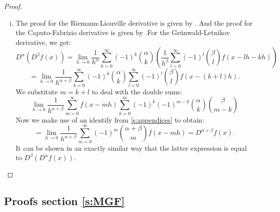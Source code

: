 \begin{proof}
\begin{enumerate}[(i)]
        \item The proof for the Riemann-Liouville derivative is given by \cite{koning15}. And the proof for the Caputo-Fabrizio derivative is given by \cite{losada15}.For the Grünwald-Letnikov derivative, we get:
        \[ D^\alpha(D^\beta f(x)) = \lim_{h \to 0} \frac{1}{h^\alpha} \sum_{k=0}^\infty (-1)^k \binom{\alpha}{k} \left( \frac{1}{h^\beta} \sum_{l=0}^\infty (-1)^l \binom{\beta}{l} f(x - l h - kh)\right)\]
        \[= \lim_{h \to 0} \frac{1}{h^{\alpha + \beta}} \sum_{k=0}^\infty (-1)^k \binom{\alpha}{k} \sum_{l=0}^\infty (-1)^l \binom{\beta}{l} f(x - (k + l)h).\] We substitute \(m = k + l\) to deal with the double sums: 
        \[ \lim_{h \to 0} \frac{1}{h^{\alpha + \beta}} \sum_{m=0}^\infty f(x - mh)  \sum_{k=0}^m (-1)^k (-1)^{ m - k} \binom{\alpha}{k} \binom{\beta}{m - k}\] Now we make use of an identify from \autoref{s:appendices} to obtain:
        \[ = \lim_{h \to 0} \frac{1}{h^{\alpha + \beta}} \sum_{m=0}^\infty (-1)^m \binom{\alpha + \beta}{m} f(x - mh) = D^{\alpha + \beta} f(x).\]
        It can be shown in an exactly similar way that the latter expression is equal to \(D^\beta(D^\alpha f(x))\).

        
    \end{enumerate}
\end{proof}

\subsection{Proofs section \ref{s:MGF}}

